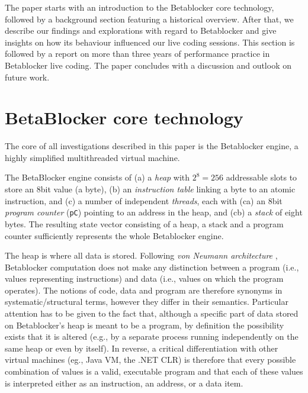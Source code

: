 \documentclass[letterpaper, 12pt]{article}
\begin{document}
The paper starts with an introduction to the Betablocker core technology, followed by a background section featuring a historical overview.
After that, we describe our findings and explorations with regard to Betablocker and give insights on how its behaviour influenced our live coding sessions.
This section is followed by a report on more than three years of performance practice in Betablocker live coding.
The paper concludes with a discussion and outlook on future work.

\section{BetaBlocker core technology}
\label{sec:betablocker_core}


The core of all investigations described in this paper is the Betablocker engine, a highly simplified multithreaded virtual machine.

The BetaBlocker engine consists of
(a) a \emph{heap} with  $2^8 = 256$ addressable slots to store an 8bit value (a byte),
(b) an \emph{instruction table} linking a byte to an atomic instruction, and
(c) a number of independent \emph{threads}, each with
	(ca) an 8bit \emph{program counter} (\texttt{pC}) pointing to an address in the heap, and (cb) a \emph{stack} of eight bytes.
The resulting state vector consisting of a heap, a stack and a program counter sufficiently represents the whole Betablocker engine.

The heap is where all data is stored.
Following \emph{von Neumann architecture} \citep*{von-neumann1993-fir}, Betablocker computation does not make any distinction between a program (i.e., values representing instructions) and data (i.e., values on which the program operates).
The notions of code, data and program are therefore synonyms in systematic/structural terms, however they differ in their semantics.
Particular attention has to be given to the fact that, although a specific part of data stored on Betablocker's heap is meant to be a program, by definition the possibility exists that it is altered (e.g., by a separate process running independently on the same heap or even by itself).
In reverse, a critical differentiation with other virtual machines (eg., Java VM, the .NET CLR) is therefore that every possible combination of values is a valid, executable program and that each of these values is interpreted either as an instruction, an address, or a data item.
\end{document}
